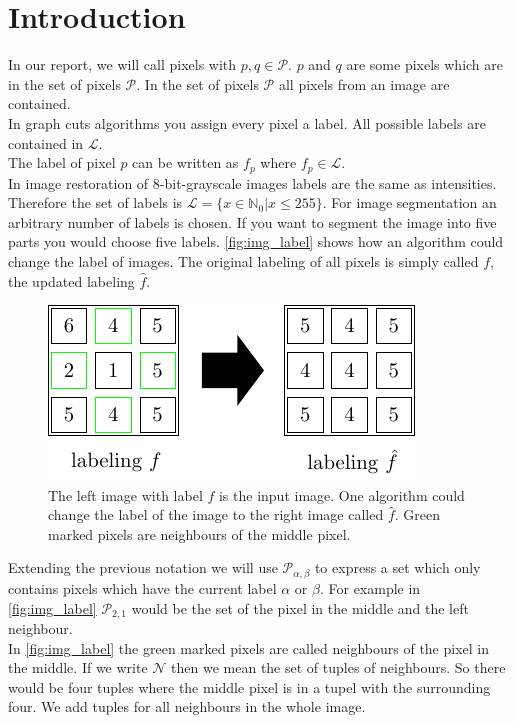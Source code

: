 \documentclass[runningheads,a4paper]{llncs}
\begin{document}
\section{Introduction}
    In our report, we will call pixels with $p,q \in \mathcal{P}$. $p$ and $q$ are some pixels which are in the set of pixels $\mathcal{P}$. 
    In the set of pixels $\mathcal{P}$ all pixels from an image are contained. \\
    In graph cuts algorithms you assign every pixel a label. All possible labels are contained in $\mathcal{L}$.\\
    The label of pixel $p$ can be written as $f_p$ where $f_p \in \mathcal{L}$. \\
    In image restoration of 8-bit-grayscale images labels are the same as intensities. Therefore the set of labels is $\mathcal{L} = \{x\in \mathbb{N}_0| x\leq 255 \}$.
    For image segmentation an arbitrary number of labels is chosen. If you want to segment the image into five parts you would choose five labels.
    \autoref{fig:img_label} shows how an algorithm could change the label of images. The original labeling of all pixels is simply called $f$, the updated labeling $\hat f$.
    \begin{figure}
        \centering
        \includegraphics[width=.6\textwidth]{../figures/image_label/image_label.pdf}
        \caption{The left image with label $f$ is the input image. One algorithm could change the label of the image to the right image called $\hat f$. Green marked pixels are neighbours of the middle pixel.}
        \label{fig:img_label}
    \end{figure}
    Extending the previous notation we will use $\mathcal{P}_{\alpha, \beta}$ to express a set which only contains pixels which have the current label $\alpha$ or $\beta$.
    For example in \autoref{fig:img_label} $\mathcal{P}_{2,1}$ would be the set of the pixel in the middle and the left neighbour.\\
    In \autoref{fig:img_label} the green marked pixels are called neighbours of the pixel in the middle. If we write $\mathcal{N}$ then we mean the set of tuples of neighbours.
    So there would be four tuples where the middle pixel is in a tupel with the surrounding four. We add tuples for all neighbours in the whole image.
\end{document}
